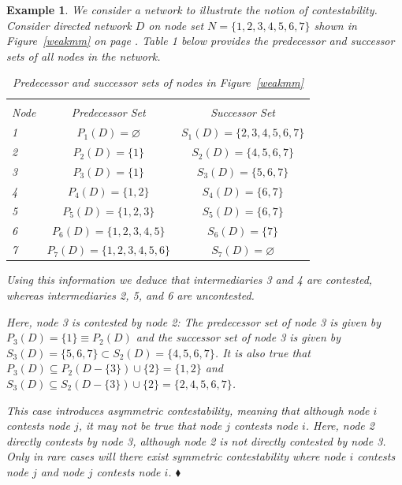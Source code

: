 \documentclass[11pt,fleqn]{article}
\newtheorem{expl}[theorem]{Example}
\newenvironment{example}{\begin{expl} \rm}{\hfill $\blacklozenge$ \end{expl}}{}
\begin{document}
\begin{example} \label{Simple Contestability}
We consider a network to illustrate the notion of contestability. Consider directed network $D$ on node set $N = \{1,2,3,4,5,6,7\}$ shown in Figure~\ref{weakmm} on page \pageref{weakmm}. Table 1 below provides the predecessor and successor sets of all nodes in the network.

\begin{table}[h]
\begin{center}
\begin{tabu}{ l c c }

\\[-1.8ex]\hline
\hline \\[-1.8ex]
Node & Predecessor Set                 & Successor Set                     \\     & $P_{1}(D)=\varnothing$          & $S_{1}(D)=\{2,3,4,5,6,7\}$        \\
2    & $P_{2}(D)=\{1\}$                & $S_{2}(D)=\{4,5,6,7\}$            \\
3    & $P_{3}(D)=\{1\}$                & $S_{3}(D)=\{5,6,7\}$              \\
4    & $P_{4}(D)=\{1,2\}$              & $S_{4}(D)=\{6,7\}$                \\
5    & $P_{5}(D)=\{1,2,3\}$            & $S_{5}(D)=\{6,7\}$                \\
6    & $P_{6}(D)=\{1,2,3,4,5\}$        & $S_{6}(D)=\{7\}$                  \\
7    & $P_{7}(D)=\{1,2,3,4,5,6\}$      & $S_{7}(D)=\varnothing$            \\ \hline
\end{tabu}\par
\caption{Predecessor and successor sets of nodes in Figure~\ref{weakmm}}
\label{network1stats}
\end{center}
\end{table}

\noindent
Using this information we deduce that intermediaries 3 and 4 are contested, whereas intermediaries 2, 5, and 6 are uncontested.

Here, node 3 is contested by node 2: The predecessor set of node 3 is given by $P_{3}(D) = \{1\} \equiv P_{2}(D)$ and the successor set of node 3 is given by $S_{3}(D) = \{5,6,7\} \subset S_{2}(D) = \{4,5,6,7\}$. It is also true that $P_{3}(D) \subseteq P_{2}(D - \{3\}) \cup \{2\} = \{ 1,2 \}$ and $S_{3}(D) \subseteq S_{2}(D - \{3\}) \cup \{2\} = \{ 2,4,5,6,7 \}$.

This case introduces \textit{asymmetric contestability}, meaning that although node $i$ contests node $j$, it may not be true that node $j$ contests node $i$. Here, node 2 directly contests by node 3, although node 2 is not directly contested by node 3. Only in rare cases will there exist \textit{symmetric contestability} where node $i$ contests node $j$ and node $j$ contests node $i$.
\end{example}
\end{document}
